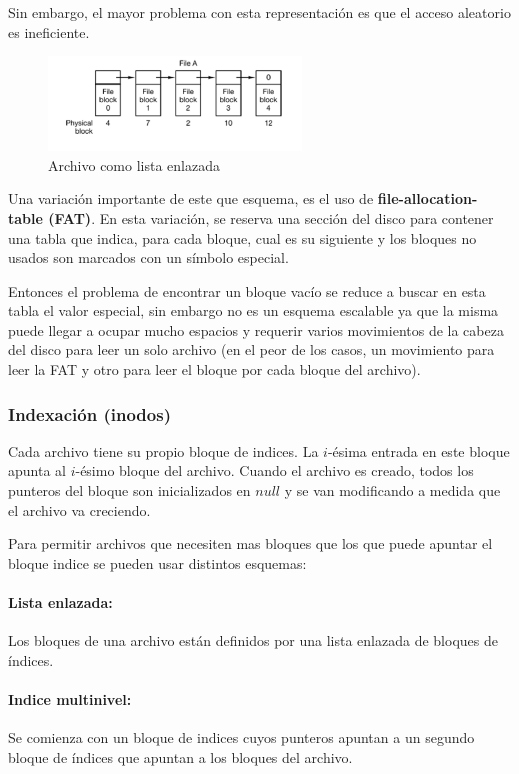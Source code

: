 Sin embargo, el mayor problema con esta representación es que el acceso aleatorio es ineficiente.

\begin{figure}[h]
	\centering
	\includegraphics[width=0.6\textwidth]{imagenes/file-lista-enlazada}
	\caption{Archivo como lista enlazada}
	\label{fig:file-lista-enlazada}
\end{figure}

Una variación importante de este que esquema, es el uso de \textbf{file-allocation-table (FAT)}. En esta variación, se reserva una sección del disco para contener una tabla que indica, para cada bloque, cual es su siguiente y los bloques no usados son marcados con un símbolo especial. 

Entonces el problema de encontrar un bloque vacío se reduce a buscar en esta tabla el valor especial, sin embargo no es un esquema escalable ya que la misma puede llegar a ocupar mucho espacios y requerir varios movimientos de la cabeza del disco para leer un solo archivo (en el peor de los casos, un movimiento para leer la FAT y otro para leer el bloque por cada bloque del archivo).

\subsubsection{Indexación (inodos)}
Cada archivo tiene su propio bloque de indices. La $i$-ésima entrada en este bloque apunta al $i$-ésimo bloque del archivo. Cuando el archivo es creado, todos los punteros del bloque son inicializados en $null$ y se van modificando a medida que el archivo va creciendo.

Para permitir archivos que necesiten mas bloques que los que puede apuntar el bloque indice se pueden usar distintos esquemas:

\paragraph{Lista enlazada:} Los bloques de una archivo están definidos por una lista enlazada de bloques de índices.

\paragraph{Indice multinivel:} Se comienza con un bloque de indices cuyos punteros apuntan a un segundo bloque de índices que apuntan a los bloques del archivo.

